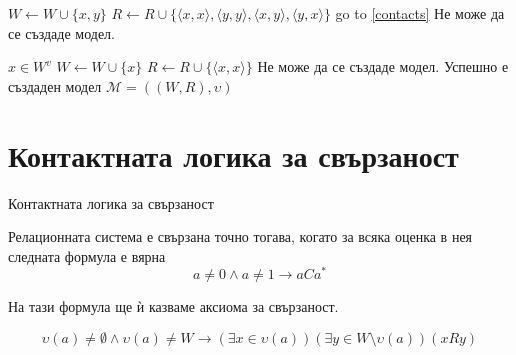\documentclass[14pt, aspectratio=169]{beamer}
\makeatletter
\renewcommand\thealgorithm{}
\newcommand{\setalglineno}[1]{\setcounter{ALC@line}{\numexpr#1-1}}
\newcommand\M{\mathcal{M}}
\newcommand{\pair}[2]{ \langle #1, #2 \rangle }
\newcommand{\pairXY}{ \pair{x}{y} }
\newcommand{\pairXX}{ \pair{x}{x} }
\newcommand{\pairYX}{ \pair{y}{x} }
\newcommand{\pairYY}{ \pair{y}{y} }
\makeatother
\begin{document}
\begin{frame}
	\begin{algorithm}[H]
	\renewcommand\thealgorithm{} %
	\begin{algorithmic}[1] %
		\setalglineno{13}
		 \label{contacts}
					\STATE $W \gets W \cup \{x, y \}$
					\STATE $R \gets R \cup \{\pairXX, \pairYY, \pairXY, \pairYX \}$
					\STATE go to \ref{contacts}
				\ENDIF
			\ENDFOR
			\STATE Не може да се създаде модел.
		\ENDFOR
	\end{algorithmic}

	\caption{Алгоритъм за строене на модел}
	\label{alg:seq}
	\end{algorithm}
\end{frame}

\begin{frame}
	\begin{algorithm}[H]
	\renewcommand\thealgorithm{} %
	\begin{algorithmic}[1] %
		\setalglineno{23}
				\STATE $x \in W^v$
				\STATE $W \gets W \cup \{ x \}$
				\STATE $R \gets R \cup \{ \pairXX \}$
			\ELSE
				\STATE Не може да се създаде модел.
			\ENDIF
		\ENDIF
		\STATE Успешно е създаден модел $\M = ((W, R), \upsilon)$
	\end{algorithmic}

	\caption{Алгоритъм за строене на модел}
	\label{alg:seq}
	\end{algorithm}
\end{frame}

\section{Контактната логика за свързаност}

\begin{frame}{Контактната логика за свързаност}
	\begin{lemma}
		Релационната система е свързана точно тогава, когато за всяка оценка в нея следната формула е вярна
		\begin{equation*}
			a \neq 0 \land a \neq 1 \rightarrow aCa^*
		\end{equation*}

		На тази формула ще ѝ казваме аксиома за свързаност.
	\end{lemma}

	\begin{equation*}
		\upsilon(a) \neq \emptyset \land \upsilon(a) \neq W \rightarrow (\exists x \in \upsilon(a)) (\exists y \in W \setminus \upsilon(a))(xRy)
	\end{equation*}
\end{frame}
\end{document}
